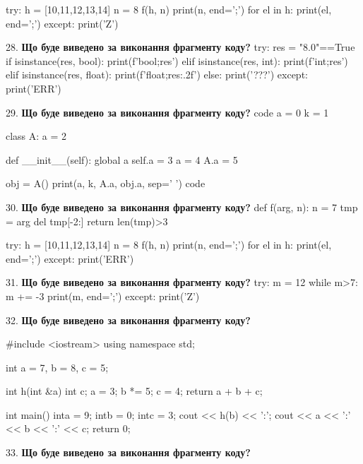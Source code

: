 \documentclass[11pt]{article}
\begin{document}
try:
    h = [10,11,12,13,14]
    n = 8
    f(h, n)
    print(n, end=';')
    for el in h:
        print(el, end=';')
except:
    print('Z')
\par\vspace{5mm}
28. \textbf{Що буде виведено за виконання фрагменту коду?}
try:
    res = "8.0"==True
    if isinstance(res, bool):
        print(f'bool;{res}')
    elif isinstance(res, int):
        print(f'int;{res}')
    elif isinstance(res, float):
        print(f'float;{res:.2f}')
    else:
        print('???')
except:
    print('ERR')
\par\vspace{5mm}
29. \textbf{Що буде виведено за виконання фрагменту коду?}
code
a = 0
k = 1

class A:
    a = 2
    
    def __init__(self):
global a        self.a = 3
        a = 4
        A.a = 5

obj = A()
print(a, k, A.a, obj.a, sep=' ')
code
\par\vspace{5mm}
30. \textbf{Що буде виведено за виконання фрагменту коду?}
def f(arg, n):
    n = 7
    tmp = arg
    del tmp[-2:]
    return len(tmp)>3

try:
    h = [10,11,12,13,14]
    n = 8
    f(h, n)
    print(n, end=';')
    for el in h:
        print(el, end=';')
except:
    print('ERR')
\par\vspace{5mm}
31. \textbf{Що буде виведено за виконання фрагменту коду?}
try:
    m = 12
    while m>7:
        m += -3
    print(m, end=';')
except:
    print('Z')
\par\vspace{5mm}
32. \textbf{Що буде виведено за виконання фрагменту коду?}

#include <iostream>
using namespace std;

int a = 7, b = 8, c = 5;

int h(int &a){
int c;    a = 3;
    b *= 5;
    c = 4;
    return a + b + c;
}

int main(){
    inta = 9;
    intb = 0;
    intc = 3;
    cout << h(b) << ':';
    cout << a << ':' << b << ':' << c;
    return 0; 
}
\par\vspace{5mm}
33. \textbf{Що буде виведено за виконання фрагменту коду?}
\end{document}
